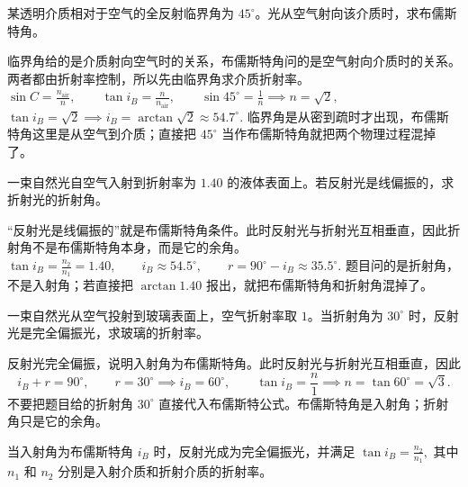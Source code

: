 \documentclass[lang=cn,11pt]{elegantbook}
\begin{document}
\begin{exercise}[由全反射临界角反推布儒斯特角]
某透明介质相对于空气的全反射临界角为 \(45^\circ\)。光从空气射向该介质时，求布儒斯特角。
\end{exercise}

\begin{solution}
临界角给的是介质射向空气时的关系，布儒斯特角问的是空气射向介质时的关系。两者都由折射率控制，所以先由临界角求介质折射率。
 \(\sin C=\frac{n_{\text{air}}}{n},\qquad \tan i_B=\frac{n}{n_{\text{air}}},\qquad \sin45^\circ=\frac{1}{n} \implies n=\sqrt2,\) 
 \(\tan i_B=\sqrt2 \implies i_B=\arctan\sqrt2\approx 54.7^\circ.\) 
临界角是从密到疏时才出现，布儒斯特角这里是从空气到介质；直接把 \(45^\circ\) 当作布儒斯特角就把两个物理过程混掉了。
\end{solution}

\begin{exercise}
一束自然光自空气入射到折射率为 \(1.40\) 的液体表面上。若反射光是线偏振的，求折射光的折射角。
\end{exercise}

\begin{solution}
“反射光是线偏振的”就是布儒斯特角条件。此时反射光与折射光互相垂直，因此折射角不是布儒斯特角本身，而是它的余角。
 \(\tan i_B=\frac{n_2}{n_1}=1.40,\qquad i_B\approx54.5^\circ,\qquad r=90^\circ-i_B\approx 35.5^\circ.\) 
题目问的是折射角，不是入射角；若直接把 \(\arctan1.40\) 报出，就把布儒斯特角和折射角混掉了。
\end{solution}

\begin{exercise}
一束自然光从空气投射到玻璃表面上，空气折射率取 \(1\)。当折射角为 \(30^\circ\) 时，反射光是完全偏振光，求玻璃的折射率。
\end{exercise}

\begin{solution}
反射光完全偏振，说明入射角为布儒斯特角。此时反射光与折射光互相垂直，因此
\[
i_B+r=90^\circ,\qquad
r=30^\circ\implies i_B=60^\circ,\qquad
\tan i_B=\frac{n}{1}
\implies
n=\tan60^\circ=\sqrt3.
\]
不要把题目给的折射角 \(30^\circ\) 直接代入布儒斯特公式。布儒斯特角是入射角；折射角只是它的余角。
\end{solution}

\begin{theorem}[布儒斯特定律]\label{thm:brewster-law}
当入射角为布儒斯特角 \(i_B\) 时，反射光成为完全偏振光，并满足
 \(\tan i_B=\frac{n_2}{n_1},\) 
其中 \(n_1\) 和 \(n_2\) 分别是入射介质和折射介质的折射率。
\end{theorem}
\end{document}
